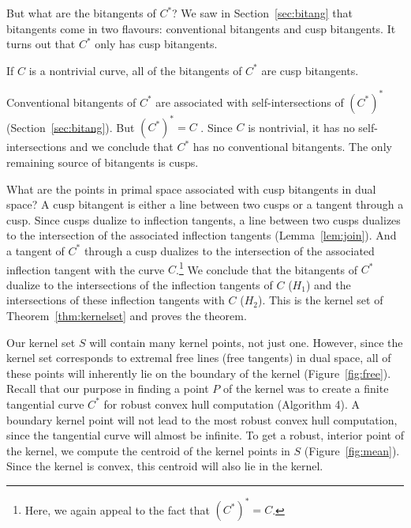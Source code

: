 \documentclass[12pt]{article}
\begin{document}

But what are the bitangents of $C^*$?
We saw in Section~\ref{sec:bitang} that
bitangents come in two flavours: conventional bitangents
and cusp bitangents.
It turns out that $C^*$ only has cusp bitangents.

\begin{lemma}
If $C$ is a nontrivial curve,
all of the bitangents of $C^*$ are cusp bitangents.
\end{lemma}
\prf
Conventional bitangents of $C^*$ are associated
with self-intersections of $(C^*)^*$ (Section~\ref{sec:bitang}).
But $(C^*)^* = C$ \cite{jj02}.
Since $C$ is nontrivial, it has no self-intersections
and we conclude that $C^*$ has no conventional bitangents.
The only remaining source of bitangents is cusps.
\QED

\vspace{-.2in}

What are the points in primal space associated with cusp bitangents in
dual space?
A cusp bitangent is either a line between two cusps
or a tangent through a cusp.
Since cusps dualize to inflection tangents,
a line between two cusps dualizes to the intersection of the associated inflection
tangents (Lemma~\ref{lem:join}).
And a tangent of $C^*$ through a cusp dualizes to the intersection of 
the associated inflection tangent with the curve $C$.\footnote{Here, we again 
	appeal to the fact that $(C^*)^* = C$.}
We conclude that the bitangents of $C^*$ dualize to
the intersections of the inflection tangents of $C$ ($H_1$) 
and the intersections of these inflection tangents with $C$
($H_2$).
This is the kernel set of Theorem~\ref{thm:kernelset}
and proves the theorem.

Our kernel set $S$ will contain many kernel points, not just one.
However, since the kernel set corresponds to extremal free lines (free tangents)
in dual space, 
all of these points will inherently lie on the boundary of the kernel
(Figure~\ref{fig:free}).
Recall that our purpose in finding a point $P$ of the kernel was to create
a finite tangential curve $C^*$ for robust convex hull computation (Algorithm 4).
A boundary kernel point will not 
lead to the most robust convex hull computation,
since the tangential curve will almost be infinite.
To get a robust, interior point of the kernel,
we compute the centroid of the kernel points in $S$ 
(Figure~\ref{fig:mean}).
Since the kernel is convex, this centroid will also lie in the kernel.
\end{document}

